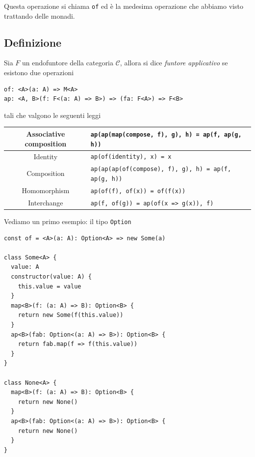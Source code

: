\documentclass[12pt]{article}
\begin{document}
Questa operazione si chiama \texttt{of} ed è la medesima operazione che abbiamo visto trattando delle monadi.

\subsection{Definizione}

Sia $F$ un endofuntore della categoria $\mathcal{C}$, allora si dice \emph{funtore applicativo} se esistono due operazioni

\begin{verbatim}
of: <A>(a: A) => M<A>
ap: <A, B>(f: F<(a: A) => B>) => (fa: F<A>) => F<B>
\end{verbatim}

tali che valgono le seguenti leggi

\begin{center}
\bgroup
\def\arraystretch{1.5}
\begin{tabular}{ |c|p{10cm}| }
\hline
Associative composition & \texttt{ap(ap(map(compose, f), g), h) = ap(f, ap(g, h))} \\
\hline
Identity & \texttt{ap(of(identity), x) = x} \\
\hline
Composition & \texttt{ap(ap(ap(of(compose), f), g), h) = ap(f, ap(g, h))} \\
\hline
Homomorphism & \texttt{ap(of(f), of(x)) = of(f(x))} \\
\hline
Interchange & \texttt{ap(f, of(g)) = ap(of(x => g(x)), f)} \\
\hline
\end{tabular}
\egroup
\end{center}

Vediamo un primo esempio: il tipo \texttt{Option}

\begin{verbatim}
const of = <A>(a: A): Option<A> => new Some(a)

class Some<A> {
  value: A
  constructor(value: A) {
    this.value = value
  }
  map<B>(f: (a: A) => B): Option<B> {
    return new Some(f(this.value))
  }
  ap<B>(fab: Option<(a: A) => B>): Option<B> {
    return fab.map(f => f(this.value))
  }
}

class None<A> {
  map<B>(f: (a: A) => B): Option<B> {
    return new None()
  }
  ap<B>(fab: Option<(a: A) => B>): Option<B> {
    return new None()
  }
}
\end{verbatim}

\end{document}
